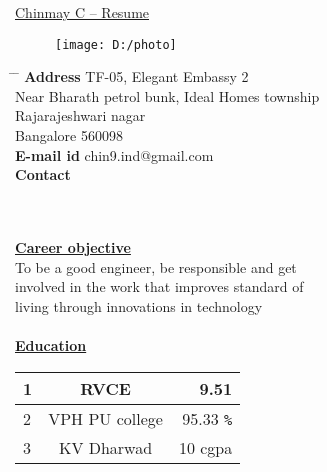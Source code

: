 \documentclass[10pt]{article}
\begin{document}
	
\begin{tabbing}
	\hspace{1cm}
	\underline{\LARGE{Chinmay C -- Resume}} %
\end{tabbing}

	\begin{figure}[h]
		\texttt{[image: D:/photo]}
	\end{figure}
	
\parbox{1.5\textwidth}{ %
	\begin{tabbing} %
		\hspace{3cm} \= \hspace{4cm} \= \kill %
		{\bf Address} \> TF-05, Elegant Embassy 2\\ %
		\> Near Bharath petrol bunk, Ideal Homes township\\ %
		\> Rajarajeshwari nagar\\ %
		\> Bangalore 560098\\ %
		{\bf E-mail id} \> chin9.ind@gmail.com  \\ %
		{\bf Contact}   \\ %
	\end{tabbing}}
	\hfill\\
	\hfill\\
	\hfill %
	\underline{\textbf{\Large{Career objective}}}\\
	
	To be a good engineer, be responsible and get\\ involved in the work that improves standard of\\ living through innovations in technology\\
	
	\hfill\\	
	\underline{\textbf{\Large{Education}}}
	\vspace{1cm}
	
	\begin{tabular}{|l|c|r|}
		\hline
		1 & RVCE & 9.51 \\
		\hline
		2 & VPH PU college & 95.33 \verb|%| \\
		\hline
		3 & KV Dharwad & 10 cgpa \\
		\hline
	\end{tabular}
\end{document}
